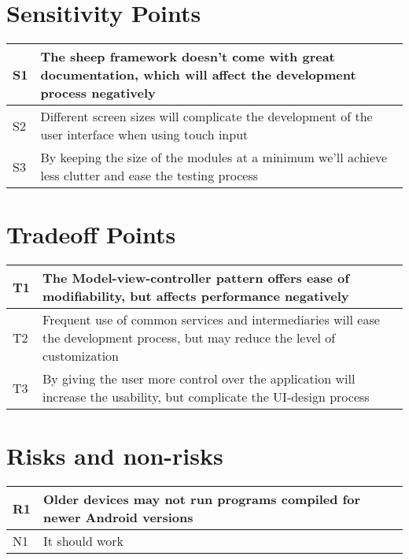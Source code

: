 \section{Sensitivity Points}

\begin{tabular}{|m{}|m{}|}
  \hline
  S1 & The sheep framework doesn't come with great documentation, which will affect the development process negatively \\ \hline
  S2 & Different screen sizes will complicate the development of the user interface when using touch input \\ \hline
  S3 & By keeping the size of the modules at a minimum we'll achieve less clutter and ease the testing process \\ \hline 
\end{tabular}

\section{Tradeoff Points}
\begin{tabular}{|m{}|m{}|}
  \hline
  T1 & The Model-view-controller pattern offers ease of modifiability, but affects performance negatively \\ \hline
  T2 & Frequent use of common services and intermediaries will ease the development process, but may reduce the
  level of customization \\ \hline
  T3 & By giving the user more control over the application will increase the usability, but complicate the UI-design process \\ \hline
\end{tabular}

\section{Risks and non-risks}
\begin{tabular}{|m{}|m{}|}
  \hline
  R1 & Older devices may not run programs compiled for newer Android versions \\ \hline
  N1 & It should work \\ \hline
\end{tabular}
